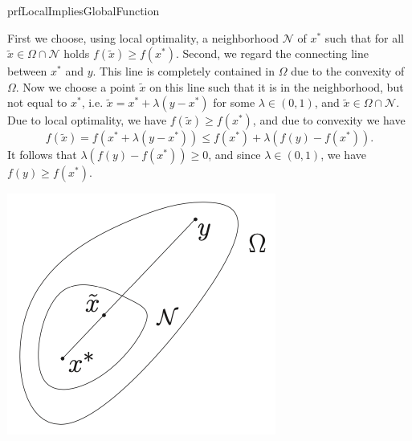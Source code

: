 \begin{prf}{prfLocalImpliesGlobalFunction}
    \begin{minipage}{0.77\textwidth}
        First we choose, using local optimality, a neighborhood $\mathcal{N}$ of $x^*$ such that for all $\tilde{x} \in \Omega \cap \mathcal{N}$ holds $f(\tilde{x}) \geq f(x^*)$. Second, we regard the connecting line between $x^*$ and $y$. This line is completely contained in $\Omega$ due to the convexity of $\Omega$. Now we choose a point $\tilde{x}$ on this line such that it is in the neighborhood, but not equal to $x^*$, i\@.e\@. $\tilde{x} = x^* + \lambda(y - x^*)$ for some $\lambda \in (0,1)$, and $\tilde{x} \in \Omega \cap \mathcal{N}$. Due to local optimality, we have $f(\tilde{x}) \geq f(x^*)$, and due to convexity we have
        \begin{equation*}
            f(\tilde{x}) = f(x^* + \lambda(y - x^*)) \leq f(x^*) + \lambda(f(y) - f(x^*)).
        \end{equation*}
        It follows that $\lambda(f(y) - f(x^*)) \geq 0$, and since $\lambda \in (0,1)$, we have $f(y) \geq f(x^*)$.
    \end{minipage}
    \begin{minipage}{0.22\textwidth}
        \includegraphics[scale = 0.6]{Images/Fundamental/ProofGlobalityLocal.png}
    \end{minipage}
\end{prf}




